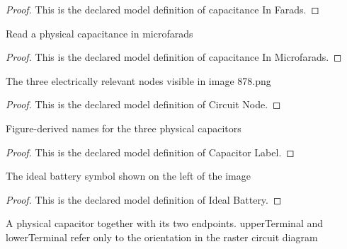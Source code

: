 \begin{proof}
  This is the declared model definition of capacitance In Farads.
\end{proof}
\begin{definition}
  \label{def:physics:phyx-mini-0878:phyxminiproblems-problemphyxmini0878-capacitanceinmicrofarads}
  Read a physical capacitance in microfarads
\end{definition}
\begin{proof}
  This is the declared model definition of capacitance In Microfarads.
\end{proof}
\begin{definition}
  \label{def:physics:phyx-mini-0878:phyxminiproblems-problemphyxmini0878-circuitnode}
  The three electrically relevant nodes visible in image 878.png
\end{definition}
\begin{proof}
  This is the declared model definition of Circuit Node.
\end{proof}
\begin{definition}
  \label{def:physics:phyx-mini-0878:phyxminiproblems-problemphyxmini0878-capacitorlabel}
  Figure-derived names for the three physical capacitors
\end{definition}
\begin{proof}
  This is the declared model definition of Capacitor Label.
\end{proof}
\begin{definition}
  \label{def:physics:phyx-mini-0878:phyxminiproblems-problemphyxmini0878-idealbattery}
  The ideal battery symbol shown on the left of the image
\end{definition}
\begin{proof}
  This is the declared model definition of Ideal Battery.
\end{proof}
\begin{definition}[Capacitor]
  \label{def:physics:phyx-mini-0878:phyxminiproblems-problemphyxmini0878-capacitor}
  A physical capacitor together with its two endpoints. upperTerminal and lowerTerminal refer only to the orientation in the raster circuit diagram
\end{definition}

